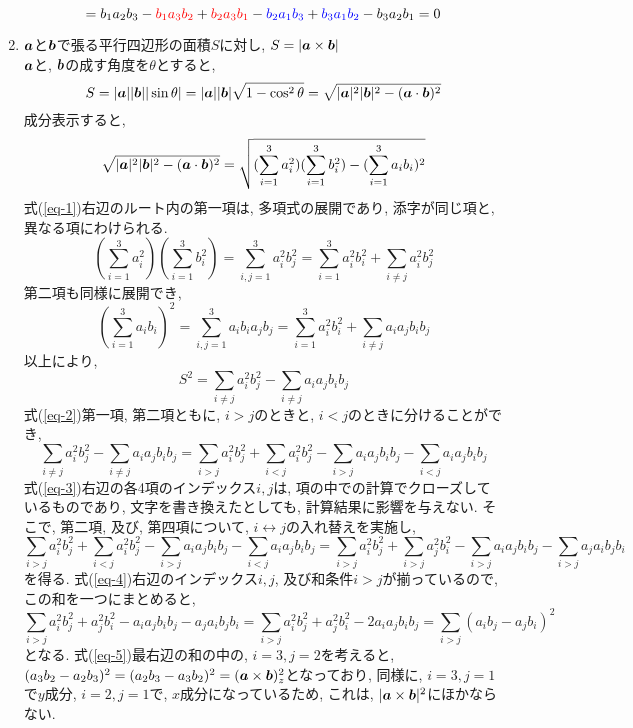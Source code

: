 \documentclass{jsarticle}
\newcommand*{\mbold}[1]{\mbox{\boldmath $#1$}}
\begin{document}
\begin{enumerate}
\[      = b_1 a_2 b_3 - \textcolor{red}{b_1 a_3 b_2}
      + \textcolor{red}{b_2 a_3 b_1} - \textcolor{blue}{b_2 a_1 b_3}
      + \textcolor{blue}{b_3 a_1 b_2} - b_3 a_2 b_1 = 0 
    \]
  \item $\mbold{a}$と$\mbold{b}$で張る平行四辺形の面積$S$に対し, $S = |\mbold{a} \times \mbold{b}|$ \\
    $\mbold{a}$と, $\mbold{b}$の成す角度を$\theta$とすると, 
    \[
      S = |\mbold{a}||\mbold{b}||\sin\theta|
      = |\mbold{a}||\mbold{b}|\sqrt{1 - \cos^2\theta}
      = \sqrt{|\mbold{a}|^2 |\mbold{b}|^2 - (\mbold{a}\cdot\mbold{b})^2}
    \]
    成分表示すると, 
    \begin{equation}\label{eq-1}
      \sqrt{|\mbold{a}|^2 |\mbold{b}|^2 - (\mbold{a}\cdot\mbold{b})^2}
      = \sqrt{(\sum_{i = 1}^{3} a_i^2) (\sum_{i = 1}^{3} b_i^2) - (\sum_{i = 1}^{3} a_i b_i)^2}
    \end{equation}
    式(\ref{eq-1})右辺のルート内の第一項は, 多項式の展開であり, 添字が同じ項と, 異なる項にわけられる. 
    \[
      (\sum_{i = 1}^{3} a_i^2) (\sum_{i = 1}^{3} b_i^2) = \sum_{i,j=1}^{3}a_i^2 b_j^2 = \sum_{i = 1}^{3}a_i^2 b_i^2 + \sum_{i \neq j}a_i^2 b_j^2
    \]
    第二項も同様に展開でき, 
    \[
      (\sum_{i = 1}^{3} a_i b_i)^2 = \sum_{i,j = 1}^{3}a_i b_i a_j b_j = \sum_{i = 1}^{3}a_i^2 b_i^2 + \sum_{i\neq j}a_i a_j b_i b_j
    \]
    以上により, 
    \begin{equation}\label{eq-2}
      S^2 = \sum_{i \neq j}a_i^2 b_j^2 - \sum_{i \neq j}a_i a_j b_i b_j
    \end{equation}
    式(\ref{eq-2})第一項, 第二項ともに, $i > j$のときと, $i < j$のときに分けることができ, 
    \begin{equation}\label{eq-3}
      \sum_{i \neq j}a_i^2 b_j^2 - \sum_{i \neq j}a_i a_j b_i b_j
      = \sum_{i > j}a_i^2 b_j^2 + \sum_{i < j}a_i^2 b_j^2 - \sum_{i > j}a_i a_j b_i b_j - \sum_{i < j}a_i a_j b_i b_j
    \end{equation}
    式(\ref{eq-3})右辺の各4項のインデックス$i, j$は, 項の中での計算でクローズしているものであり, 文字を書き換えたとしても, 計算結果に影響を与えない. そこで, 第二項, 及び, 第四項について, $i \leftrightarrow j$の入れ替えを実施し, 
    \begin{equation}\label{eq-4}
      \sum_{i > j}a_i^2 b_j^2 + \sum_{i < j}a_i^2 b_j^2 - \sum_{i > j}a_i a_j b_i b_j - \sum_{i < j}a_i a_j b_i b_j
      = \sum_{i > j}a_i^2 b_j^2 + \sum_{i > j}a_j^2 b_i^2 - \sum_{i > j}a_i a_j b_i b_j - \sum_{i > j}a_j a_i b_j b_i
    \end{equation}
    を得る. 式(\ref{eq-4})右辺のインデックス$i, j$, 及び和条件$i > j$が揃っているので, この和を一つにまとめると, 
    \begin{equation}\label{eq-5}
      \sum_{i > j}a_i^2 b_j^2 + a_j^2 b_i^2 - a_i a_j b_i b_j - a_j a_i b_j b_i = \sum_{i > j}a_i^2 b_j^2 + a_j^2 b_i^2 - 2 a_i a_j b_i b_j = \sum_{i > j}(a_i b_j - a_j b_i)^2
    \end{equation}
    となる. 
    式(\ref{eq-5})最右辺の和の中の, $i = 3, j = 2$を考えると, $(a_3 b_2 - a_2 b_3)^2 = (a_2 b_3 - a_3 b_2)^2 = (\mbold{a} \times \mbold{b})_z^2$となっており, 同様に, $i = 3, j = 1$で$y$成分, $i = 2, j = 1$で, $x$成分になっているため, これは, $|\mbold{a} \times \mbold{b}|^2$にほかならない. 
\end{enumerate}
\end{document}
